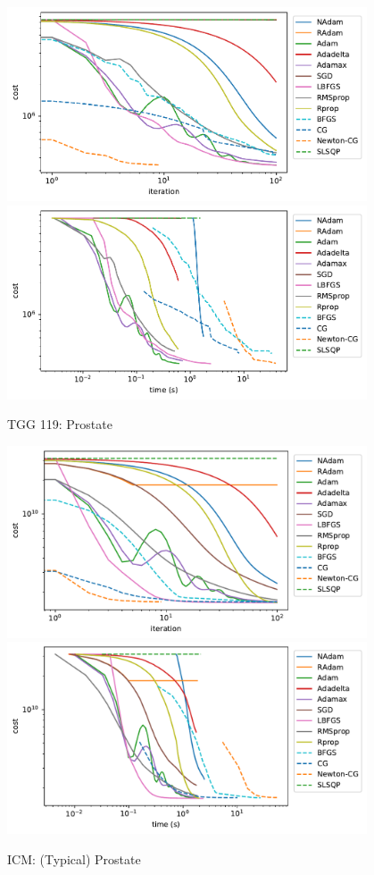 \documentclass[a4paper]{article}
\begin{document}
	\begin{figure}[H]
		\centering
		\includegraphics[width=0.95\textwidth]{figures/TGG119Prostate-iter.pdf}		\includegraphics[width=0.95\textwidth]{figures/TGG119Prostate-time.pdf}
		\caption{TGG 119: Prostate}
		\label{fig:tgg119prostate}
	\end{figure}
	
	\begin{figure}[H]
		\centering
		\includegraphics[width=0.95\textwidth]{figures/ICMProstate-iter.pdf}		\includegraphics[width=0.95\textwidth]{figures/ICMProstate-time.pdf}
		\caption{ICM: (Typical) Prostate}
		\label{fig:ICMprostate}
	\end{figure}
	
\end{document}
